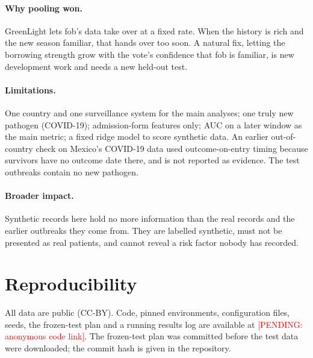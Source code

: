 \documentclass[10pt]{article}
\newcommand{\PENDING}[1]{\textcolor{red}{[PENDING: #1]}}
\begin{document}
\paragraph{Why pooling won.} GreenLight lets fob's data take over at a fixed rate. When the history is rich and the new season
familiar, that hands over too soon. A natural fix, letting the borrowing strength grow with the vote's confidence that
fob is familiar, is new development work and needs a new held-out test.
\paragraph{Limitations.} One country and one surveillance system for the main analyses; one truly new pathogen
(COVID-19); admission-form features only; AUC on a later window as the main metric; a fixed ridge model to score
synthetic data. An earlier out-of-country check on Mexico's COVID-19 data used outcome-on-entry timing because
survivors have no outcome date there, and is not reported as evidence. The test outbreaks contain no new pathogen.
\paragraph{Broader impact.} Synthetic records here hold no more information than the real records and the earlier
outbreaks they come from. They are labelled synthetic, must not be presented as real patients, and cannot reveal a
risk factor nobody has recorded.

\section{Reproducibility}
All data are public (CC-BY). Code, pinned environments, configuration files, seeds, the frozen-test plan and a
running results log are available at \PENDING{anonymous code link}. The frozen-test plan was committed before the
test data were downloaded; the commit hash is given in the repository.




\end{document}
